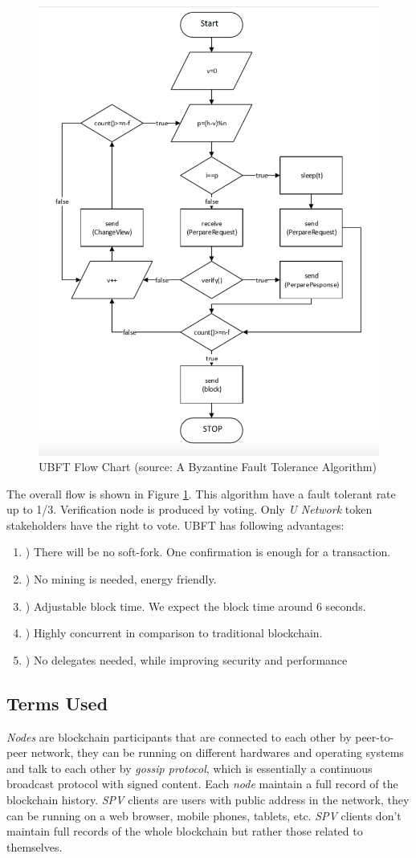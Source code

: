 \begin{figure}
\centering
\includegraphics[width= 0.7 \linewidth]{consensus.png}
\caption{UBFT Flow Chart (source: A Byzantine Fault Tolerance Algorithm\cite{neo})}
\label{fig:ubft}
\end{figure}    
    
    The overall flow is shown in Figure \ref{fig:ubft}. This algorithm have a fault tolerant rate up to 1/3. Verification node is produced by voting. Only \emph{U Network} token stakeholders have the right to vote.  UBFT has following advantages:
\begin{enumerate}
    \item ) There will be no soft-fork. One confirmation is enough for a transaction. 
    \item ) No mining is needed, energy friendly.
    \item ) Adjustable block time. We expect the block time around 6 seconds. 
    \item ) Highly concurrent in comparison to traditional blockchain. 
    \item ) No delegates needed, while improving security and performance
\end{enumerate}



\subsection{Terms Used}
    \textit{Nodes} are blockchain participants that are connected to each other by peer-to-peer network, they can be running on different hardwares and operating systems and talk to each other by \textit{gossip protocol}, which is essentially a continuous broadcast protocol with signed content. Each \textit{node} maintain a full record of the blockchain history. \textit{SPV} clients are users with public address in the network, they can be running on a web browser, mobile phones, tablets, etc. \textit{SPV} clients don't maintain full records of the whole blockchain but rather those related to themselves.

